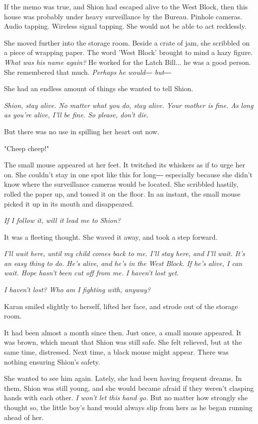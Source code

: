 If the memo was true, and Shion had escaped alive to the West Block,
then this house was probably under heavy surveillance by the Bureau.
Pinhole cameras. Audio tapping. Wireless signal tapping. She would not
be able to act recklessly.

She moved further into the storage room. Beside a crate of jam, she
scribbled on a piece of wrapping paper. The word 'West Block' brought to
mind a hazy figure. \emph{What was his name again?} He worked for the Latch
Bill... he was a good person. She remembered that much. \emph{Perhaps he
	would― but―}

She had an endless amount of things she wanted to tell Shion.

\emph{Shion, stay alive. No matter what you do, stay alive. Your mother is
	fine. As long as you're alive, I'll be fine. So please, don't die.}

But there was no use in spilling her heart out now.

"Cheep cheep!"

The small mouse appeared at her feet. It twitched its whiskers as if to
urge her on. She couldn't stay in one spot like this for long―
especially because she didn't know where the surveillance cameras would
be located. She scribbled hastily, rolled the paper up, and tossed it on
the floor. In an instant, the small mouse picked it up in its mouth and
disappeared.

\emph{If I follow it, will it lead me to Shion?}

It was a fleeting thought. She waved it away, and took a step forward.

\emph{I'll wait here, until my child comes back to me. I'll stay here, and
	I'll wait. It's an easy thing to do. He's alive, and he's in the West
	Block. If he's alive, I can wait. Hope hasn't been cut off from me. I
	haven't lost yet.}

\emph{I haven't lost? Who am I fighting with, anyway?}

Karan smiled slightly to herself, lifted her face, and strode out of the
storage room.

It had been almost a month since then. Just once, a small mouse
appeared. It was brown, which meant that Shion was still safe. She felt
relieved, but at the same time, distressed. Next time, a black mouse
might appear. There was nothing ensuring Shion's safety.

She wanted to see him again. Lately, she had been having frequent
dreams. In them, Shion was still young, and she would became afraid if
they weren't clasping hands with each other. \emph{I won't let this hand go.}
But no matter how strongly she thought so, the little boy's hand would
always slip from hers as he began running ahead of her.

